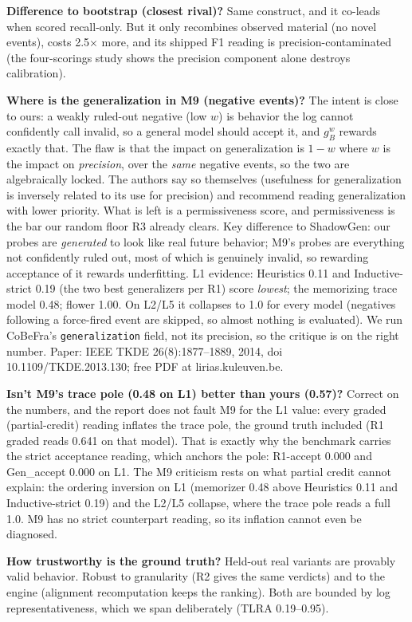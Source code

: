 \documentclass[10pt]{article}
\newcommand{\kv}[2]{\noindent\textbf{#1} #2\par}
\begin{document}
\kv{Difference to bootstrap (closest rival)?}{Same construct, and it co-leads when scored recall-only. But it only recombines observed material (no novel events), costs 2.5$\times$ more, and its shipped F1 reading is precision-contaminated (the four-scorings study shows the precision component alone destroys calibration).}
\kv{Where is the generalization in M9 (negative events)?}{The intent is close to ours: a weakly ruled-out negative (low $w$) is behavior the log cannot confidently call invalid, so a general model should accept it, and $g^w_B$ rewards exactly that. The flaw is that the impact on generalization is $1-w$ where $w$ is the impact on \emph{precision}, over the \emph{same} negative events, so the two are algebraically locked. The authors say so themselves (usefulness for generalization is inversely related to its use for precision) and recommend reading generalization with lower priority. What is left is a permissiveness score, and permissiveness is the bar our random floor R3 already clears. Key difference to ShadowGen: our probes are \emph{generated} to look like real future behavior; M9's probes are everything not confidently ruled out, most of which is genuinely invalid, so rewarding acceptance of it rewards underfitting. L1 evidence: Heuristics 0.11 and Inductive-strict 0.19 (the two best generalizers per R1) score \emph{lowest}; the memorizing trace model 0.48; flower 1.00. On L2/L5 it collapses to 1.0 for every model (negatives following a force-fired event are skipped, so almost nothing is evaluated). We run CoBeFra's \texttt{generalization} field, not its precision, so the critique is on the right number. Paper: IEEE TKDE 26(8):1877--1889, 2014, doi 10.1109/TKDE.2013.130; free PDF at lirias.kuleuven.be.}
\kv{Isn't M9's trace pole (0.48 on L1) better than yours (0.57)?}{Correct on the numbers, and the report does not fault M9 for the L1 value: every graded (partial-credit) reading inflates the trace pole, the ground truth included (R1 graded reads 0.641 on that model). That is exactly why the benchmark carries the strict acceptance reading, which anchors the pole: R1-accept 0.000 and Gen\_accept 0.000 on L1. The M9 criticism rests on what partial credit cannot explain: the ordering inversion on L1 (memorizer 0.48 above Heuristics 0.11 and Inductive-strict 0.19) and the L2/L5 collapse, where the trace pole reads a full 1.0. M9 has no strict counterpart reading, so its inflation cannot even be diagnosed.}
\kv{How trustworthy is the ground truth?}{Held-out real variants are provably valid behavior. Robust to granularity (R2 gives the same verdicts) and to the engine (alignment recomputation keeps the ranking). Both are bounded by log representativeness, which we span deliberately (TLRA 0.19--0.95).}
\end{document}
